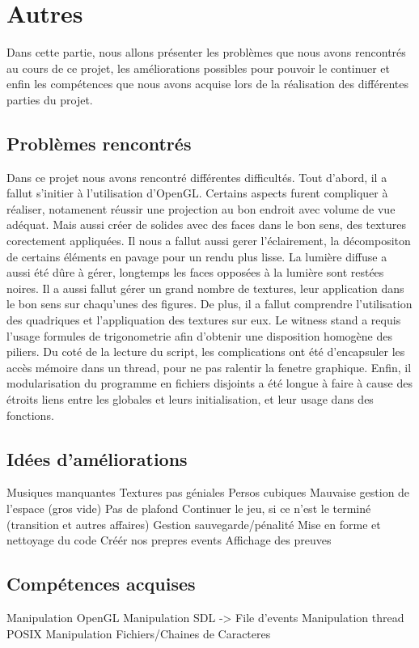 \section{Autres}
	
	Dans cette partie, nous allons présenter les problèmes que nous avons rencontrés au cours de ce projet, les améliorations possibles pour pouvoir le continuer et enfin les compétences que nous avons acquise lors de la réalisation des différentes parties du projet.
	
\subsection{Problèmes rencontrés}
	Dans ce projet nous avons rencontré différentes difficultés. Tout d'abord, il a fallut s'initier à l'utilisation d'OpenGL. Certains aspects furent compliquer à réaliser, notamenent réussir une projection au bon endroit avec volume de vue adéquat. Mais aussi créer de solides avec des faces dans le bon sens, des textures corectement appliquées. Il nous a fallut aussi gerer l'éclairement, la décompositon de certains éléments en pavage pour un rendu plus lisse. La lumière diffuse a aussi été dûre à gérer, longtemps les faces opposées à la lumière sont restées noires. Il a aussi fallut gérer un grand nombre de textures, leur application dans le bon sens sur chaqu'unes des figures. De plus, il a fallut comprendre l'utilisation des quadriques et l'appliquation des textures sur eux. Le witness stand a requis l'usage formules de trigonometrie afin d'obtenir une disposition homogène des piliers.
	Du coté de la lecture du script, les complications ont été d'encapsuler les accès mémoire dans un thread, pour ne pas ralentir la fenetre graphique.
	 Enfin, il modularisation du programme en fichiers disjoints a été longue à faire à cause des étroits liens entre les globales et leurs initialisation, et leur usage dans des fonctions.
\subsection{Idées d'améliorations}
	Musiques manquantes
	Textures pas géniales
	Persos cubiques
	Mauvaise gestion de l'espace (gros vide)
	Pas de plafond 
	Continuer le jeu, si ce n'est le terminé (transition et autres affaires)
	Gestion sauvegarde/pénalité
	Mise en forme et nettoyage du code
	Créér nos prepres events
	Affichage des preuves

\subsection{Compétences acquises}
	Manipulation OpenGL
	Manipulation SDL -> File d'events
	Manipulation thread POSIX
	Manipulation Fichiers/Chaines de Caracteres